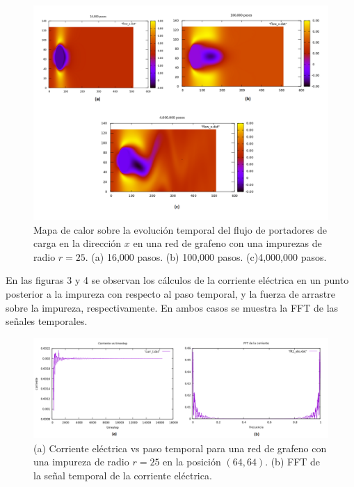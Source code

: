 \documentclass{article}
\begin{document}
 \begin{figure}[th!]
   \includegraphics[width=1.1\columnwidth]{karrman.png}
   \caption{Mapa de calor sobre la evolución temporal del flujo de portadores de carga en la dirección $x$ en una red de grafeno con una impurezas de radio $r=25$. (a) 16,000 pasos. (b) 100,000 pasos. (c)4,000,000 pasos. }
\end{figure}
 
 En las figuras 3 y 4 se observan los cálculos de la corriente eléctrica en un punto posterior a la impureza con respecto al paso temporal, y la fuerza de arrastre sobre la impureza, respectivamente. En ambos casos se muestra la FFT de las señales temporales.

\begin{figure}[th!]
   \includegraphics[width=1.1\columnwidth]{corriente_1obs.png}
   \caption{(a) Corriente eléctrica vs paso temporal para una red de grafeno con una impureza de radio $r=25$ en la posición $(64, 64)$. (b) FFT de la señal temporal de la corriente eléctrica.}
\end{figure}
\end{document}

